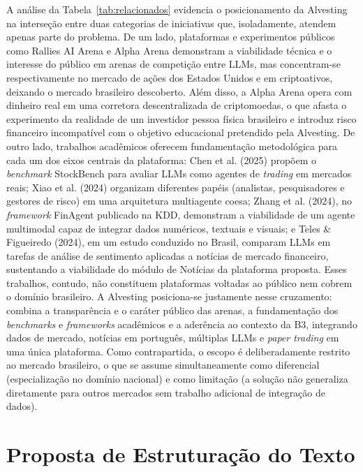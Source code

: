 \documentclass[portuguese]{sbcreviews-2025}
\begin{document}
A análise da Tabela~\ref{tab:relacionados} evidencia o posicionamento da Alvesting na interseção entre duas categorias de iniciativas que, isoladamente, atendem apenas parte do problema. De um lado, plataformas e experimentos públicos como Rallies AI Arena e Alpha Arena demonstram a viabilidade técnica e o interesse do público em arenas de competição entre LLMs, mas concentram-se respectivamente no mercado de ações dos Estados Unidos e em criptoativos, deixando o mercado brasileiro descoberto. Além disso, a Alpha Arena opera com dinheiro real em uma corretora descentralizada de criptomoedas, o que afasta o experimento da realidade de um investidor pessoa física brasileiro e introduz risco financeiro incompatível com o objetivo educacional pretendido pela Alvesting. De outro lado, trabalhos acadêmicos oferecem fundamentação metodológica para cada um dos eixos centrais da plataforma: Chen et al. (2025) propõem o \textit{benchmark} StockBench para avaliar LLMs como agentes de \textit{trading} em mercados reais; Xiao et al. (2024) organizam diferentes papéis (analistas, pesquisadores e gestores de risco) em uma arquitetura multiagente coesa; Zhang et al. (2024), no \textit{framework} FinAgent publicado na KDD, demonstram a viabilidade de um agente multimodal capaz de integrar dados numéricos, textuais e visuais; e Teles \& Figueiredo (2024), em um estudo conduzido no Brasil, comparam LLMs em tarefas de análise de sentimento aplicadas a notícias de mercado financeiro, sustentando a viabilidade do módulo de Notícias da plataforma proposta. Esses trabalhos, contudo, não constituem plataformas voltadas ao público nem cobrem o domínio brasileiro. A Alvesting posiciona-se justamente nesse cruzamento: combina a transparência e o caráter público das arenas, a fundamentação dos \textit{benchmarks} e \textit{frameworks} acadêmicos e a aderência ao contexto da B3, integrando dados de mercado, notícias em português, múltiplas LLMs e \textit{paper trading} em uma única plataforma. Como contrapartida, o escopo é deliberadamente restrito ao mercado brasileiro, o que se assume simultaneamente como diferencial (especialização no domínio nacional) e como limitação (a solução não generaliza diretamente para outros mercados sem trabalho adicional de integração de dados).

\section{Proposta de Estruturação do Texto}
\end{document}
